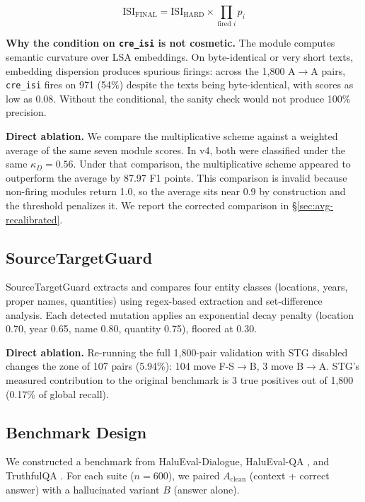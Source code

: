 \documentclass[11pt,a4paper]{article}
\begin{document}
\begin{equation}
\text{ISI}_{\text{FINAL}} = \text{ISI}_{\text{HARD}} \times \prod_{\text{fired } i} p_i
\end{equation}

\textbf{Why the condition on \texttt{cre\_isi} is not cosmetic.} The module computes semantic curvature over LSA embeddings. On byte-identical or very short texts, embedding dispersion produces spurious firings: across the 1{,}800 A$\rightarrow$A pairs, \texttt{cre\_isi} fires on 971 (54\%) despite the texts being byte-identical, with scores as low as 0.08. Without the conditional, the sanity check would not produce 100\% precision.

\textbf{Direct ablation.} We compare the multiplicative scheme against a weighted average of the same seven module scores. In v4, both were classified under the same $\kappa_D = 0.56$. Under that comparison, the multiplicative scheme appeared to outperform the average by 87.97 F1 points. This comparison is invalid because non-firing modules return 1.0, so the average sits near 0.9 by construction and the threshold penalizes it. We report the corrected comparison in \S\ref{sec:avg-recalibrated}.

\subsection{SourceTargetGuard}
SourceTargetGuard extracts and compares four entity classes (locations, years, proper names, quantities) using regex-based extraction and set-difference analysis. Each detected mutation applies an exponential decay penalty (location 0.70, year 0.65, name 0.80, quantity 0.75), floored at 0.30.

\textbf{Direct ablation.} Re-running the full 1{,}800-pair validation with STG disabled changes the zone of 107 pairs (5.94\%): 104 move F-S$\to$B, 3 move B$\to$A. STG's measured contribution to the original benchmark is 3 true positives out of 1{,}800 (0.17\% of global recall).

\subsection{Benchmark Design}

We constructed a benchmark from HaluEval-Dialogue, HaluEval-QA \citep{li2023halueval}, and TruthfulQA \citep{lin2022truthfulqa}. For each suite ($n = 600$), we paired $A_{\text{clean}}$ (context + correct answer) with a hallucinated variant $B$ (answer alone).
\end{document}
